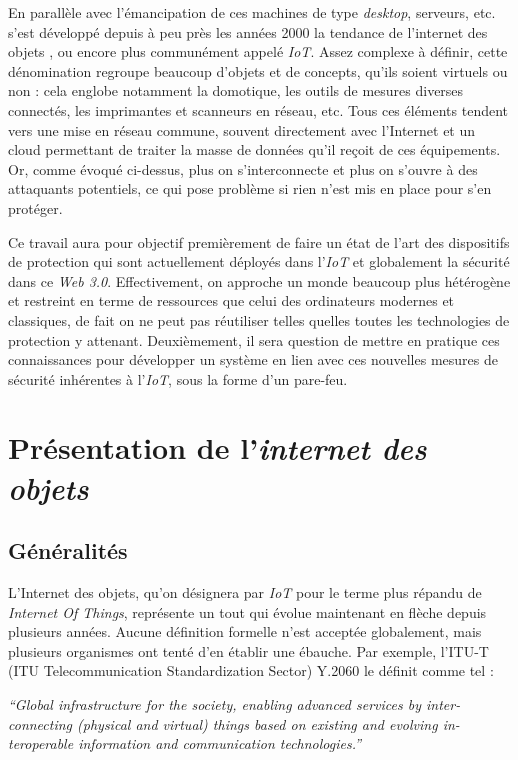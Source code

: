 \documentclass[]{article}
\begin{document}
\par En parallèle avec l'émancipation de ces machines de type \textit{desktop}, serveurs, etc. s'est développé depuis à peu près les années 2000 la tendance de l'\og internet des objets \fg{}, ou encore plus communément appelé \textit{IoT}. Assez complexe à définir, cette dénomination regroupe beaucoup d'objets et de concepts, qu'ils soient virtuels ou non : cela englobe notamment la domotique, les outils de mesures diverses connectés, les imprimantes et scanneurs en réseau, etc. Tous ces éléments tendent vers une mise en réseau commune, souvent directement avec l'Internet et un cloud permettant de traiter la masse de données qu'il reçoit de ces équipements. Or, comme évoqué ci-dessus, plus on s'interconnecte et plus on s'ouvre à des attaquants potentiels, ce qui pose problème si rien n'est mis en place pour s'en protéger.\\

\par Ce travail aura pour objectif premièrement de faire un état de l'art des dispositifs de protection qui sont actuellement déployés dans l'\textit{IoT} et globalement la sécurité dans ce \textit{Web 3.0}. Effectivement, on approche un monde beaucoup plus hétérogène et restreint en terme de ressources que celui des ordinateurs modernes et classiques, de fait on ne peut pas réutiliser telles quelles toutes les technologies de protection y attenant. Deuxièmement, il sera question de mettre en pratique ces connaissances pour développer un système en lien avec ces nouvelles mesures de sécurité inhérentes à l'\textit{IoT}, sous la forme d'un pare-feu.

\newpage
\section{Présentation de l'\textit{internet des objets}}

\subsection{Généralités}

\par L'Internet des objets, qu'on désignera par \textit{IoT} pour le terme plus répandu de \textit{Internet Of Things}, représente un tout qui évolue maintenant en flèche depuis plusieurs années. Aucune définition formelle n'est acceptée globalement, mais plusieurs organismes ont tenté d'en établir une ébauche. Par exemple, l'ITU-T (ITU Telecommunication Standardization Sector) Y.2060 le définit comme tel : 
\begin{center}
\textit{“Global  infrastructure  for  the  society,  enabling  advanced  services  by  inter-connecting (physical and virtual) things based on existing and evolving in-teroperable information and communication technologies.”}
\end{center}
\end{document}
